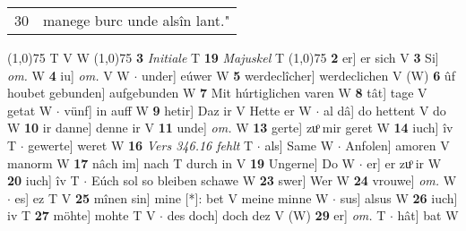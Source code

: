 \documentclass[8pt,a4paper,notitlepage]{article}
\begin{document}
\begin{table}[ht]
\begin{minipage}[t]{0.5\linewidth}
\begin{tabular}{rl}
30 & manege burc unde alsîn lant."\\ 
\end{tabular}
\scriptsize
\line(1,0){75} \newline
T V W \newline
\line(1,0){75} \newline
\textbf{3} \textit{Initiale} T  \textbf{19} \textit{Majuskel} T  \newline
\line(1,0){75} \newline
\textbf{2} er] er sich V \textbf{3} Si] \textit{om.} W \textbf{4} iu] \textit{om.} V W  $\cdot$ under] eúwer W \textbf{5} werdeclîcher] werdeclichen V (W) \textbf{6} ûf houbet gebunden] aufgebunden W \textbf{7} Mit húrtiglichen varen W \textbf{8} tât] tage V getat W  $\cdot$ vünf] in auff W \textbf{9} hetir] Daz ir V Hette er W  $\cdot$ al dâ] do hettent V do W \textbf{10} ir danne] denne ir V \textbf{11} unde] \textit{om.} W \textbf{13} gerte] zuͦ mir geret W \textbf{14} iuch] îv T  $\cdot$ gewerte] weret W \textbf{16} \textit{Vers 346.16 fehlt} T   $\cdot$ als] Same W  $\cdot$ Anfolen] amoren V manorm W \textbf{17} nâch im] nach T durch in V \textbf{19} Ungerne] Do W  $\cdot$ er] er zuͦ ir W \textbf{20} iuch] îv T  $\cdot$ Eúch sol so bleiben schawe W \textbf{23} swer] Wer W \textbf{24} vrouwe] \textit{om.} W  $\cdot$ es] ez T V \textbf{25} mînen sin] mine [*]: bet V meine minne W  $\cdot$ sus] alsus W \textbf{26} iuch] iv T \textbf{27} möhte] mohte T V  $\cdot$ des doch] doch dez V (W) \textbf{29} er] \textit{om.} T  $\cdot$ hât] bat W \newline
\end{minipage}
\end{table}
\end{document}
